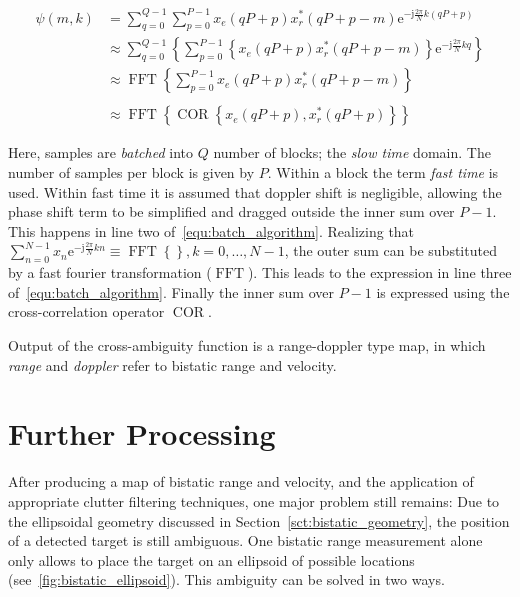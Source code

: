 \begin{equation}\label{equ:batch_algorithm}
    \begin{split}
        \psi(m,k) & = \sum_{q = 0}^{Q - 1}{\sum_{p = 0}^{P - 1}{x_{e}(q P + p) x_{r}^{*}(q P + p - m) \mathrm{e}^{-\mathrm{j} \frac{2 \pi}{N} k (q P + p)}}} \\
        & \approx \sum_{q = 0}^{Q - 1}{ \left\{ \sum_{p = 0}^{P - 1}{ \left\{ x_{e}(q P + p) x_{r}^{*}(q P + p - m) \right\} } \mathrm{e}^{-\mathrm{j} \frac{2 \pi}{N} k q} \right\} } \\
        & \approx \operatorname{FFT} \left\{ \sum_{p = 0}^{P - 1}{ x_{e}(q P + p) x_{r}^{*}(q P + p - m) } \right\} \\
        \\
        & \approx \operatorname{FFT} { \left\{ \operatorname{COR} { \left\{ x_{e}(q P + p), x_{r}^{*}(q P + p) \right\} } \right\} }
    \end{split}
\end{equation}

Here, samples are \emph{batched} into \(Q\) number of blocks; the \emph{slow time} domain. The number of samples per block is given by \(P\). Within a block the term \emph{fast time} is used. Within fast time it is assumed that doppler shift is negligible, allowing the phase shift term to be simplified and dragged outside the inner sum over \(P - 1\). This happens in line two of~\ref{equ:batch_algorithm}. Realizing that \(\sum_{n = 0}^{N - 1}{ x_{n} \mathrm{e}^{-\mathrm{j} \frac{2 \pi}{N} k n} } \equiv \operatorname{FFT}{ \left\{ \right\} }, k = 0, \dots, N - 1 \), the outer sum can be substituted by a fast fourier transformation (\(\operatorname{FFT}\)). This leads to the expression in line three of~\ref{equ:batch_algorithm}. Finally the inner sum over \(P - 1\) is expressed using the cross-correlation operator \(\operatorname{COR}\).

Output of the cross-ambiguity function is a range-doppler type map, in which \emph{range} and \emph{doppler} refer to bistatic range and velocity.

\section{Further Processing}

After producing a map of bistatic range and velocity, and the application of appropriate clutter filtering techniques, one major problem still remains: Due to the ellipsoidal geometry discussed in Section~\ref{sct:bistatic_geometry}, the position of a detected target is still ambiguous. One bistatic range measurement alone only allows to place the target on an ellipsoid of possible locations (see~\ref{fig:bistatic_ellipsoid}). This ambiguity can be solved in two ways.

